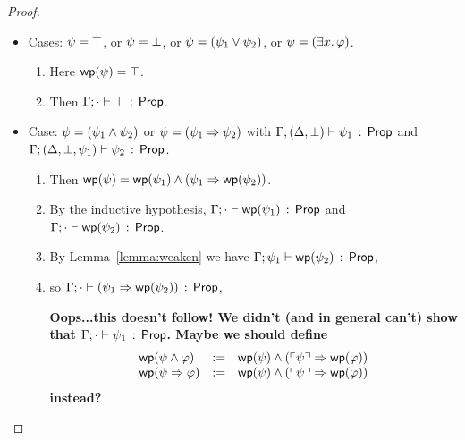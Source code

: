 \documentclass[10pt,a4paper]{article}
\begin{document}
\begin{proof}
\begin{itemize}
  \item Cases: $\psi = \top$, or $\psi = \bot$, or $\psi=(\psi_1 \vee \psi_2)$,
      or $\psi=(\exists x.\, \varphi)$.
      \begin{enumerate}
      \item 
      	Here $\mathop{\mathsf{wp}}(\psi) = \top$.
      \item
        Then $\Gamma;\cdot \vdash \top\, :\, \mathsf{Prop}$.
      \end{enumerate}
            
  \item Case: $\psi = (\psi_1 \wedge \psi_2)$ or $\psi = (\psi_1 \Rightarrow \psi_2)$ with
       $\Gamma;(\Delta,\bot) \vdash \psi_1\, :\, \mathsf{Prop}$ and 
              $\Gamma;(\Delta,\bot,\psi_1) \vdash \psi_2\, :\, \mathsf{Prop}$.
       \begin{enumerate}
       \item 
       		Then $\mathop{\mathsf{wp}}(\psi) = \mathop{\mathsf{wp}}(\psi_1) \wedge (\psi_1 \Rightarrow \mathop{\mathsf{wp}}(\psi_2))$.
       \item 
       		By the inductive hypothesis,
         	$\Gamma;\cdot \vdash \mathop{\mathsf{wp}}(\psi_1)\, :\, \mathsf{Prop}$
         	and $\Gamma;\cdot \vdash \mathop{\mathsf{wp}}(\psi_2)\, :\, \mathsf{Prop}$.
       \item 
         By Lemma~\ref{lemma:weaken} we have 
         $\Gamma;\psi_1 \vdash \mathop{\mathsf{wp}}(\psi_2)\, :\, \mathsf{Prop}$,
       \item so $\Gamma;\cdot \vdash (\psi_1 \Rightarrow \mathop{\mathsf{wp}}(\psi_2))\, :\, \mathsf{Prop}$,


         {\bf Oops...this doesn't follow!  We didn't (and in
           general can't) show that $\Gamma;\cdot \vdash \psi_1\, :\, \mathsf{Prop}$.
         Maybe we should define 
\[
\begin{array}{lll}
\mathop{\mathsf{wp}}(\psi \wedge \varphi) &:=& \mathop{\mathsf{wp}}(\psi) \wedge (\ulcorner \psi \urcorner \Rightarrow \mathop{\mathsf{wp}}(\varphi))\\
\mathop{\mathsf{wp}}(\psi \Rightarrow \varphi) &:=& \mathop{\mathsf{wp}}(\psi) \wedge (\ulcorner \psi \urcorner \Rightarrow \mathop{\mathsf{wp}}(\varphi))\\
\end{array}
\]
instead?
}
         

\end{enumerate}
\end{itemize}
\end{proof}
\end{document}
